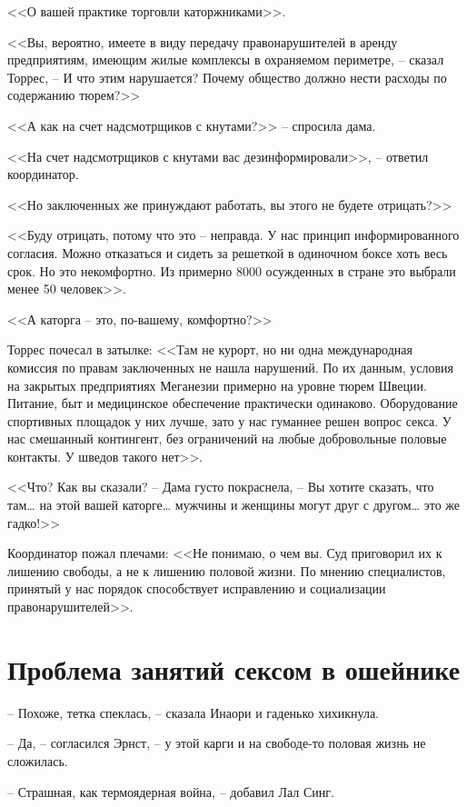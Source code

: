 <<О вашей практике торговли каторжниками>>.

<<Вы, вероятно, имеете в виду передачу правонарушителей в аренду предприятиям, имеющим жилые комплексы в охраняемом периметре, -- сказал Торрес, -- И что этим нарушается? Почему общество должно нести расходы по содержанию тюрем?>>

<<А как на счет надсмотрщиков с кнутами?>> -- спросила дама.

<<На счет надсмотрщиков с кнутами вас дезинформировали>>, -- ответил координатор.

<<Но заключенных же принуждают работать, вы этого не будете отрицать?>>

<<Буду отрицать, потому что это -- неправда. У нас принцип информированного согласия. Можно отказаться и сидеть за решеткой в одиночном боксе хоть весь срок. Но это некомфортно. Из примерно 8000 осужденных в стране это выбрали менее 50 человек>>.

<<А каторга -- это, по-вашему, комфортно?>>

Торрес почесал в затылке: <<Там не курорт, но ни одна международная комиссия по правам заключенных не нашла нарушений. По их данным, условия на закрытых предприятиях Меганезии примерно на уровне тюрем Швеции. Питание, быт и медицинское обеспечение практически одинаково. Оборудование спортивных площадок у них лучше, зато у нас гуманнее решен вопрос секса. У нас смешанный контингент, без ограничений на любые добровольные половые контакты. У шведов такого нет>>.

<<Что? Как вы сказали? -- Дама густо покраснела, -- Вы хотите сказать, что там\ldots{} на этой вашей каторге\ldots{} мужчины и женщины могут друг с другом\ldots{} это же гадко!>>

Координатор пожал плечами: <<Не понимаю, о чем вы. Суд приговорил их к лишению свободы, а не к лишению половой жизни. По мнению специалистов, принятый у нас порядок способствует исправлению и социализации правонарушителей>>.


\chapter{Проблема занятий сексом в ошейнике}


-- Похоже, тетка спеклась, -- сказала Инаори и гаденько хихикнула.

-- Да, -- согласился Эрнст, -- у этой карги и на свободе-то половая жизнь не сложилась.

-- Страшная, как термоядерная война, -- добавил Лал Синг.

